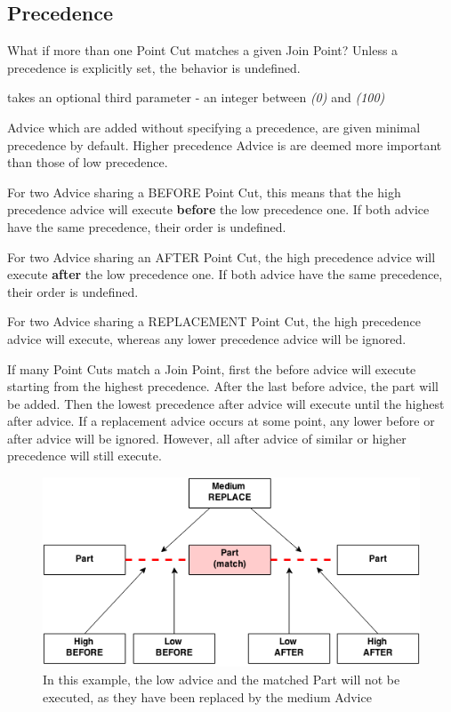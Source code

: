 \documentclass[letterpaper,10pt,english]{sphinxmanual}
\begin{document}
\subsection{Precedence}
\label{tutorial:precedence}
What if more than one Point Cut matches a given Join Point? Unless a precedence is explicitly
set, the behavior is undefined.

 takes an optional third parameter - an integer between  \emph{(0)}
and  \emph{(100)}

Advice which are added without specifying a precedence, are given minimal precedence by default. Higher precedence Advice is are deemed more important than those of low precedence.

For two Advice sharing a BEFORE Point Cut, this means that the high precedence advice will execute \textbf{before} the low precedence one. If both advice have the same precedence, their order is undefined.

For two Advice sharing an AFTER Point Cut, the high precedence advice will execute \textbf{after} the low precedence one. If both advice have the same precedence, their order is undefined.

For two Advice sharing a REPLACEMENT Point Cut, the high precedence advice will execute, whereas any lower precedence advice will be ignored.

If many Point Cuts match a Join Point, first the before advice will execute starting from the highest precedence. After the last before advice, the part will be added. Then the lowest precedence after advice will execute until the highest after advice. If a replacement advice occurs at some point, any lower before or after advice will be ignored. However, all after advice of similar or higher precedence will still execute.
\begin{figure}[htbp]
\centering
\capstart

\includegraphics{point_cut_precedence.png}
\caption{In this example, the low advice and the matched Part will not be executed, as they have been replaced
by the medium Advice}\end{figure}
\end{document}
